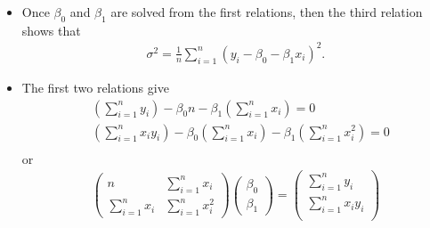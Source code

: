 \begin{frame}[fragile]
\begin{itemize}
	\item[] Once $\beta_0$  and $\beta_1$ are solved from the first relations, then the third relation shows that
	\begin{align*}
		\sigma^2 = \frac{1}{n} \sum_{i=1}^n (y_i-\beta_0-\beta_1x_i)^2.
	\end{align*}
	\item[] The first two relations give
	\begin{align*}
		& \left(\sum_{i=1}^n y_i\right) - \beta_0  n - \beta_1 \left(\sum_{i=1}^n x_i\right) = 0\\
		& \left(\sum_{i=1}^n x_iy_i\right) - \beta_0 \left(\sum_{i=1}^n x_i\right) - \beta_1 \left(\sum_{i=1}^n x_i^2\right) = 0\\
	\end{align*}
	or
	\begin{align*}
		\begin{pmatrix}
			n & \sum_{i=1}^n x_i\\
			\sum_{i=1}^n x_i & \sum_{i=1}^n x_i^2
		\end{pmatrix}
		\begin{pmatrix} \beta_0\\ \beta_1 \end{pmatrix}
		=
		\begin{pmatrix}
		\sum_{i=1}^n y_i\\
		\sum_{i=1}^n x_iy_i\\
		\end{pmatrix}
	\end{align*}
\end{itemize}
\end{frame}
